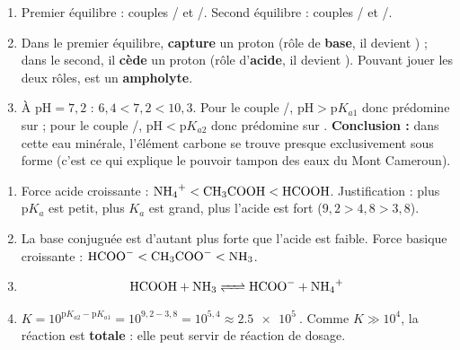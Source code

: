 \documentclass[11pt]{article}
\begin{document}
\begin{corrige}
\begin{enumerate}
\item Premier équilibre : couples / et /. Second équilibre : couples / et /.
\item Dans le premier équilibre,  \textbf{capture} un proton (rôle de \textbf{base}, il devient ) ; dans le second, il \textbf{cède} un proton (rôle d'\textbf{acide}, il devient ). Pouvant jouer les deux rôles,  est un \textbf{ampholyte}.
\item À $\mathrm{pH} = 7,2$ : $6,4 < 7,2 < 10,3$. Pour le couple /, $\mathrm{pH} > \mathrm{p}K_{a1}$ donc  prédomine sur  ; pour le couple /, $\mathrm{pH} < \mathrm{p}K_{a2}$ donc  prédomine sur . \textbf{Conclusion :} dans cette eau minérale, l'élément carbone se trouve presque exclusivement sous forme  (c'est ce qui explique le pouvoir tampon des eaux du Mont Cameroun).
\end{enumerate}
\end{corrige}

\begin{corrige}
\begin{enumerate}
\item Force acide croissante : $\ce{NH4+} < \ce{CH3COOH} < \ce{HCOOH}$. Justification : plus $\mathrm{p}K_a$ est petit, plus $K_a$ est grand, plus l'acide est fort ($9,2 > 4,8 > 3,8$).
\item La base conjuguée est d'autant plus forte que l'acide est faible. Force basique croissante : $\ce{HCOO-} < \ce{CH3COO-} < \ce{NH3}$.
\item \[ \ce{HCOOH + NH3 <=> HCOO- + NH4+} \]
\item $K = 10^{\mathrm{p}K_{a2}-\mathrm{p}K_{a1}} = 10^{9,2-3,8} = 10^{5,4} \approx \SI{2,5e5}{}$. Comme $K \gg 10^{4}$, la réaction est \textbf{totale} : elle peut servir de réaction de dosage.
\end{enumerate}
\end{corrige}
\end{document}
